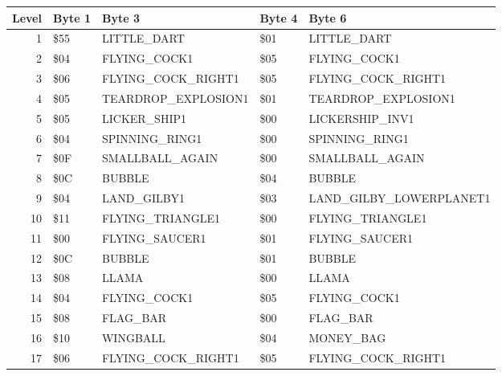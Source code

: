\begin{figure}[H]
  {
  \setlength{\tabcolsep}{3.0pt}
  \setlength\cmidrulewidth{\heavyrulewidth} %
  \begin{adjustbox}{width=\textwidth}

\begin{tabular}{rllll}
\toprule
   Level & Byte 1    & Byte 3              & Byte 4    & Byte 6                  \\
\midrule
       1 & \$55       & LITTLE\_DART         & \$01       & LITTLE\_DART             \\
       2 & \$04       & FLYING\_COCK1        & \$05       & FLYING\_COCK1            \\
       3 & \$06       & FLYING\_COCK\_RIGHT1  & \$05       & FLYING\_COCK\_RIGHT1      \\
       4 & \$05       & TEARDROP\_EXPLOSION1 & \$01       & TEARDROP\_EXPLOSION1     \\
       5 & \$05       & LICKER\_SHIP1        & \$00       & LICKERSHIP\_INV1         \\
       6 & \$04       & SPINNING\_RING1      & \$00       & SPINNING\_RING1          \\
       7 & \$0F       & SMALLBALL\_AGAIN     & \$00       & SMALLBALL\_AGAIN         \\
       8 & \$0C       & BUBBLE              & \$04       & BUBBLE                  \\
       9 & \$04       & LAND\_GILBY1         & \$03       & LAND\_GILBY\_LOWERPLANET1 \\
      10 & \$11       & FLYING\_TRIANGLE1    & \$00       & FLYING\_TRIANGLE1        \\
      11 & \$00       & FLYING\_SAUCER1      & \$01       & FLYING\_SAUCER1          \\
      12 & \$0C       & BUBBLE              & \$01       & BUBBLE                  \\
      13 & \$08       & LLAMA               & \$00       & LLAMA                   \\
      14 & \$04       & FLYING\_COCK1        & \$05       & FLYING\_COCK1            \\
      15 & \$08       & FLAG\_BAR            & \$00       & FLAG\_BAR                \\
      16 & \$10       & WINGBALL            & \$04       & MONEY\_BAG               \\
      17 & \$06       & FLYING\_COCK\_RIGHT1  & \$05       & FLYING\_COCK\_RIGHT1      \\

\end{tabular}
\end{adjustbox}}
\end{figure}
